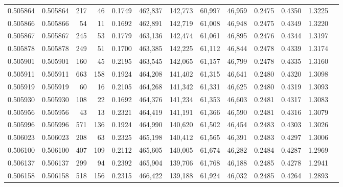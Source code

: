 \begin{tabular}{rrrrrrrrrrrrr}
0.505864 & 0.505864 &   217 &    46 &                                     0.1749 & 462,837 & 142,773 &  60,997 &  46,959 & 0.2475 & 0.4350 & 1.3225 \\
0.505866 & 0.505866 &    54 &    11 &                                     0.1692 & 462,891 & 142,719 &  61,008 &  46,948 & 0.2475 & 0.4349 & 1.3220 \\
0.505867 & 0.505867 &   245 &    53 &                                     0.1779 & 463,136 & 142,474 &  61,061 &  46,895 & 0.2476 & 0.4344 & 1.3197 \\
0.505878 & 0.505878 &   249 &    51 &                                     0.1700 & 463,385 & 142,225 &  61,112 &  46,844 & 0.2478 & 0.4339 & 1.3174 \\
0.505901 & 0.505901 &   160 &    45 &                                     0.2195 & 463,545 & 142,065 &  61,157 &  46,799 & 0.2478 & 0.4335 & 1.3160 \\
0.505911 & 0.505911 &   663 &   158 &                                     0.1924 & 464,208 & 141,402 &  61,315 &  46,641 & 0.2480 & 0.4320 & 1.3098 \\
0.505919 & 0.505919 &    60 &    16 &                                     0.2105 & 464,268 & 141,342 &  61,331 &  46,625 & 0.2480 & 0.4319 & 1.3093 \\
0.505930 & 0.505930 &   108 &    22 &                                     0.1692 & 464,376 & 141,234 &  61,353 &  46,603 & 0.2481 & 0.4317 & 1.3083 \\
0.505956 & 0.505956 &    43 &    13 &                                     0.2321 & 464,419 & 141,191 &  61,366 &  46,590 & 0.2481 & 0.4316 & 1.3079 \\
0.505996 & 0.505996 &   571 &   136 &                                     0.1924 & 464,990 & 140,620 &  61,502 &  46,454 & 0.2483 & 0.4303 & 1.3026 \\
0.506023 & 0.506023 &   208 &    63 &                                     0.2325 & 465,198 & 140,412 &  61,565 &  46,391 & 0.2483 & 0.4297 & 1.3006 \\
0.506100 & 0.506100 &   407 &   109 &                                     0.2112 & 465,605 & 140,005 &  61,674 &  46,282 & 0.2484 & 0.4287 & 1.2969 \\
0.506137 & 0.506137 &   299 &    94 &                                     0.2392 & 465,904 & 139,706 &  61,768 &  46,188 & 0.2485 & 0.4278 & 1.2941 \\
0.506158 & 0.506158 &   518 &   156 &                                     0.2315 & 466,422 & 139,188 &  61,924 &  46,032 & 0.2485 & 0.4264 & 1.2893 \\

\end{tabular}
